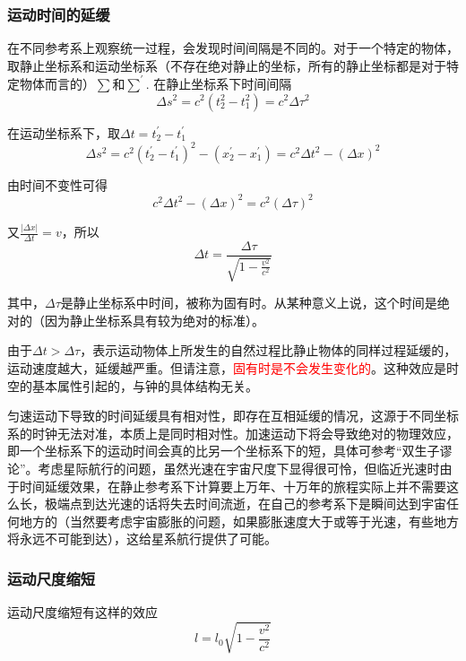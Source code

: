 \documentclass[UTF8]{ctexart}
\newcommand{\red}{\textcolor{red}}
\begin{document}
    \subsubsection{运动时间的延缓}
    在不同参考系上观察统一过程，会发现时间间隔是不同的。对于一个特定的物体，取静止坐标系和运动坐标系（不存在绝对静止的坐标，所有的静止坐标都是对于特定物体而言的）$\sum$和$\sum^{\prime}$. 在静止坐标系下时间间隔
    \begin{equation}
        \Delta s^2 = c^2(t_2^2-t_1^2) =c^2 \Delta \tau^2
    \end{equation}

\noindent 在运动坐标系下，取$\Delta t=t_2^{\prime}-t_1^{\prime}$
\begin{equation}
    \Delta s^2 = c^2(t_2^{\prime}-t_1^{\prime})^2 - (x_2^{\prime}-x_1^{\prime}) = c^2 \Delta t^{2} - (\Delta x)^2
\end{equation}

\noindent 由时间不变性可得
\begin{equation}
    c^2 \Delta t^2 - (\Delta x)^2 = c^2 (\Delta \tau)^2
\end{equation}

\noindent 又$\frac{|\Delta x|}{\Delta t} = v$，所以
\begin{equation}
    \Delta t = \frac{\Delta \tau}{\sqrt{1-\frac{v^2}{c^2}}}
\end{equation}

\noindent 其中，$\Delta \tau$是静止坐标系中时间，被称为固有时。从某种意义上说，这个时间是绝对的（因为静止坐标系具有较为绝对的标准）。

    由于$\Delta t > \Delta \tau$，表示运动物体上所发生的自然过程比静止物体的同样过程延缓的，运动速度越大，延缓越严重。但请注意，\red{固有时是不会发生变化的}。这种效应是时空的基本属性引起的，与钟的具体结构无关。

    匀速运动下导致的时间延缓具有相对性，即存在互相延缓的情况，这源于不同坐标系的时钟无法对准，本质上是同时相对性。加速运动下将会导致绝对的物理效应，即一个坐标系下的运动时间会真的比另一个坐标系下的短，具体可参考“双生子谬论”。考虑星际航行的问题，虽然光速在宇宙尺度下显得很可怜，但临近光速时由于时间延缓效果，在静止参考系下计算要上万年、十万年的旅程实际上并不需要这么长，极端点到达光速的话将失去时间流逝，在自己的参考系下是瞬间达到宇宙任何地方的（当然要考虑宇宙膨胀的问题，如果膨胀速度大于或等于光速，有些地方将永远不可能到达），这给星系航行提供了可能。

    \subsubsection{运动尺度缩短}
    运动尺度缩短有这样的效应
    \begin{equation}
        l = l_0 \sqrt{1-\frac{v^2}{c^2}}
    \end{equation}
\end{document}
